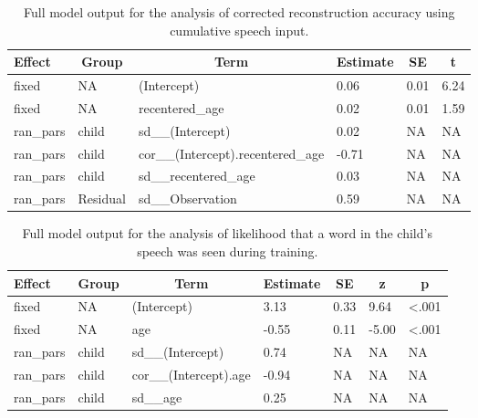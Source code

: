 \documentclass[
  english,
  man,floatsintext]{apa6}
\begin{document}
\begin{table}[tbp]

\begin{center}
\begin{threeparttable}

\caption{\label{tab:tab-corr_reconstr_acc-cumu-MAIN}Full model output for the analysis of corrected reconstruction accuracy using cumulative speech input.}

\begin{tabular}{llllll}
\toprule
Effect & \multicolumn{1}{c}{Group} & \multicolumn{1}{c}{Term} & \multicolumn{1}{c}{Estimate} & \multicolumn{1}{c}{SE} & \multicolumn{1}{c}{t}\\
\midrule
fixed & NA & (Intercept) & 0.06 & 0.01 & 6.24\\
fixed & NA & recentered\_age & 0.02 & 0.01 & 1.59\\
ran\_pars & child & sd\_\_(Intercept) & 0.02 & NA & NA\\
ran\_pars & child & cor\_\_(Intercept).recentered\_age & -0.71 & NA & NA\\
ran\_pars & child & sd\_\_recentered\_age & 0.03 & NA & NA\\
ran\_pars & Residual & sd\_\_Observation & 0.59 & NA & NA\\
\bottomrule
\end{tabular}

\end{threeparttable}
\end{center}

\end{table}

\begin{table}[tbp]

\begin{center}
\begin{threeparttable}

\caption{\label{tab:tab-unseen_words-local-MAIN}Full model output for the analysis of likelihood that a word in the child's speech was seen during training.}

\begin{tabular}{lllllll}
\toprule
Effect & \multicolumn{1}{c}{Group} & \multicolumn{1}{c}{Term} & \multicolumn{1}{c}{Estimate} & \multicolumn{1}{c}{SE} & \multicolumn{1}{c}{z} & \multicolumn{1}{c}{p}\\
\midrule
fixed & NA & (Intercept) & 3.13 & 0.33 & 9.64 & <.001\\
fixed & NA & age & -0.55 & 0.11 & -5.00 & <.001\\
ran\_pars & child & sd\_\_(Intercept) & 0.74 & NA & NA & NA\\
ran\_pars & child & cor\_\_(Intercept).age & -0.94 & NA & NA & NA\\
ran\_pars & child & sd\_\_age & 0.25 & NA & NA & NA\\
\bottomrule
\end{tabular}

\end{threeparttable}
\end{center}

\end{table}
\end{document}
